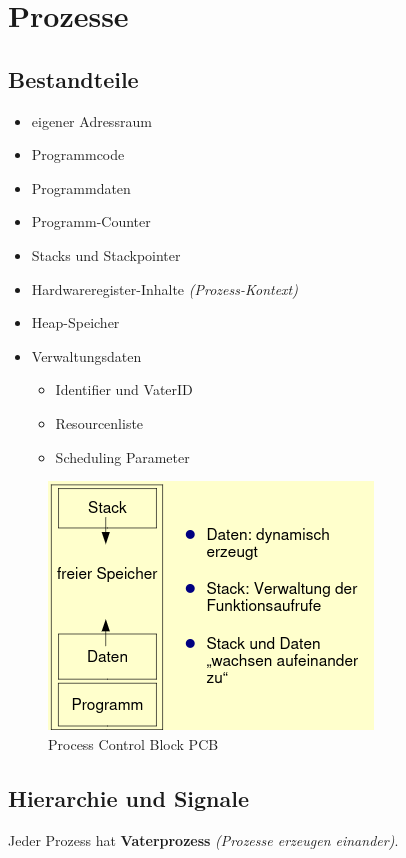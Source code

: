 \section{Prozesse}

\subsection{Bestandteile}
\begin{itemize}
    \item eigener Adressraum
    \item Programmcode
    \item Programmdaten
    \item Programm-Counter
    \item Stacks und Stackpointer
    \item Hardwareregister-Inhalte \textit{(Prozess-Kontext)}
    \item Heap-Speicher
    \item Verwaltungsdaten
    \begin{itemize}
        \item Identifier und VaterID
        \item Resourcenliste
        \item Scheduling Parameter
    \end{itemize}
\end{itemize}

\begin{figure}[ht!]
    \includegraphics[scale=.75]{pics/processes}
    \caption{Process Control Block PCB}
\end{figure}

\subsection{Hierarchie und Signale}
Jeder Prozess hat \textbf{Vaterprozess} \textit{(Prozesse erzeugen einander)}.

